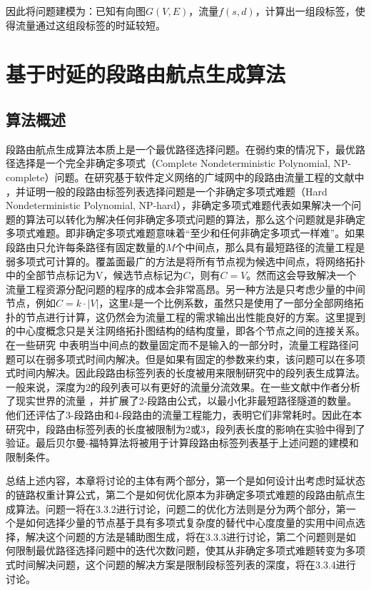 因此将问题建模为：已知有向图$G(V, E)$，流量$f(s, d)$，计算出一组段标签，使得流量通过这组段标签的时延较短。

\section{基于时延的段路由航点生成算法}

\subsection{算法概述}

段路由航点生成算法本质上是一个最优路径选择问题。在弱约束的情况下，最优路径选择是一个完全非确定多项式（Complete Nondeterministic Polynomial, NP-complete）问题。在研究基于软件定义网络的广域网中的段路由流量工程的文献中 \cite{SRBANDWIDTH8} ，并证明一般的段路由标签列表选择问题是一个非确定多项式难题（Hard Nondeterministic Polynomial, NP-hard），非确定多项式难题代表如果解决一个问题的算法可以转化为解决任何非确定多项式问题的算法，那么这个问题就是非确定多项式难题。即非确定多项式难题意味着“至少和任何非确定多项式一样难”。如果段路由只允许每条路径有固定数量的$M$个中间点，那么具有最短路径的流量工程是弱多项式可计算的。覆盖面最广的方法是将所有节点视为候选中间点，将网络拓扑中的全部节点标记为V，候选节点标记为$C$，则有$C = V$。然而这会导致解决一个流量工程资源分配问题的程序的成本会非常高昂。另一种方法是只考虑少量的中间节点，例如$C=k \cdot |V|$，这里$k$是一个比例系数，虽然只是使用了一部分全部网络拓扑的节点进行计算，这仍然会为流量工程的需求输出出性能良好的方案。这里提到的中心度概念只是关注网络拓扑图结构的结构度量，即各个节点之间的连接关系。在一些研究 \cite{SRBANDWIDTH9} 中表明当中间点的数量固定而不是输入的一部分时，流量工程路径问题可以在弱多项式时间内解决。但是如果有固定的参数来约束，该问题可以在多项式时间内解决。因此段路由标签列表的长度被用来限制研究中的段列表生成算法。一般来说，深度为2的段列表可以有更好的流量分流效果。在一些文献中作者分析了现实世界的流量 \cite{2SR} ，并扩展了2-段路由公式，以最小化非最短路径隧道的数量。他们还评估了3-段路由和4-段路由的流量工程能力，表明它们非常耗时。因此在本研究中，段路由标签列表的长度被限制为2或3，段列表长度的影响在实验中得到了验证。最后贝尔曼-福特算法将被用于计算段路由标签列表基于上述问题的建模和限制条件。

总结上述内容，本章将讨论的主体有两个部分，第一个是如何设计出考虑时延状态的链路权重计算公式，第二个是如何优化原本为非确定多项式难题的段路由航点生成算法。问题一将在3.3.2进行讨论，问题二的优化方法则是分为两个部分，第一个是如何选择少量的节点基于具有多项式复杂度的替代中心度度量的实用中间点选择，解决这个问题的方法是辅助图生成，将在3.3.3进行讨论，第二个问题则是如何限制最优路径选择问题中的迭代次数问题，使其从非确定多项式难题转变为多项式时间解决问题，这个问题的解决方案是限制段标签列表的深度，将在3.3.4进行讨论。

